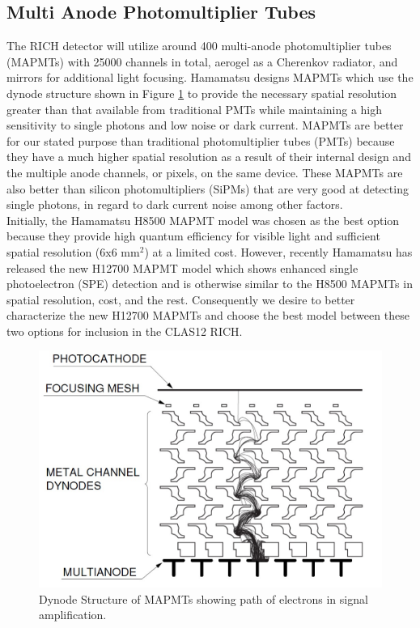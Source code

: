 \documentclass[prc,twocolumn]{revtex4}
\begin{document}
	 \subsection{Multi Anode Photomultiplier Tubes}
	 
		\indent The RICH detector will utilize around 400 multi-anode photomultiplier tubes (MAPMTs) with 25000 channels in total, aerogel as a Cherenkov radiator, and mirrors for additional light focusing. \cite{CDR}  Hamamatsu designs MAPMTs which use the dynode structure shown in Figure \ref{MAPMT} to provide the necessary spatial resolution greater than that available from traditional PMTs while maintaining a high sensitivity to single photons and low noise or dark current.  MAPMTs are better for our stated purpose than traditional photomultiplier tubes (PMTs) because they have a much higher spatial resolution as a result of their internal design and the multiple anode channels, or pixels, on the same device.  These MAPMTs are also better than silicon photomultipliers (SiPMs) that are very good at detecting single photons, in regard to dark current noise among other factors.
		\\
		\indent Initially, the Hamamatsu H8500 MAPMT model was chosen as the best option because they provide high quantum efficiency for visible light and sufficient spatial resolution (6x6 mm$^2$) at a limited cost.  However, recently Hamamatsu has released the new H12700 MAPMT model which shows enhanced single photoelectron (SPE) detection and is otherwise similar to the H8500 MAPMTs in spatial resolution, cost, and the rest.  Consequently we desire to better characterize the new H12700 MAPMTs and choose the best model between these two options for inclusion in the CLAS12 RICH.
	
		\begin{figure}
			\includegraphics[width=1.0\linewidth]{dynodestructure.jpg}
			\caption{Dynode Structure of MAPMTs showing path of electrons in signal amplification. \cite{hamamatsu}}
			\label{MAPMT}
		\end{figure}
\end{document}
